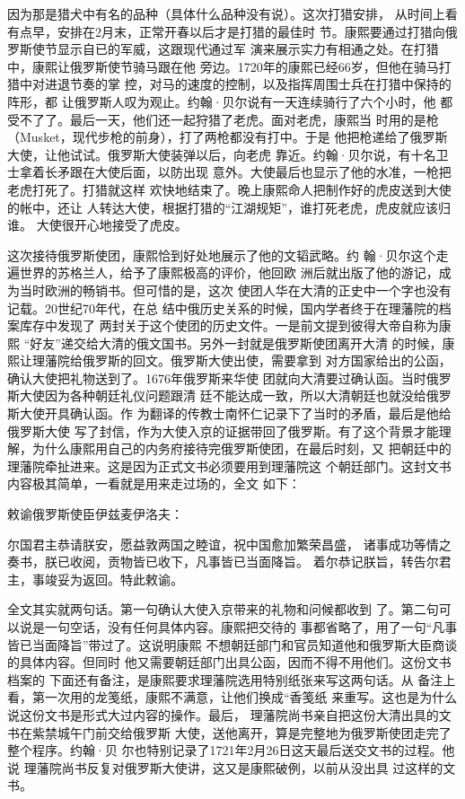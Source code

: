 因为那是猎犬中有名的品种（具体什么品种没有说）。这次打猎安排，%
从时间上看有点早，安排在2月末，正常开春以后才是打猎的最佳时%
节。康熙要通过打猎向俄罗斯使节显示自已的军威，这跟现代通过军%
演来展示实力有相通之处。在打猎中，康熙让俄罗斯使节骑马跟在他%
旁边。1720年的康熙已经66岁，但他在骑马打猎中对进退节奏的掌%
控，对马的速度的控制，以及指挥周围士兵在打猎中保持的阵形，都%
让俄罗斯人叹为观止。约翰·贝尔说有一天连续骑行了六个小时，他%
都受不了了。最后一天，他们还一起狩猎了老虎。面对老虎，康熙当%
时用的是枪（Musket，现代步枪的前身），打了两枪都没有打中。于是%
他把枪递给了俄罗斯大使，让他试试。俄罗斯大使装弹以后，向老虎%
靠近。约翰·贝尔说，有十名卫士拿着长矛跟在大使后面，以防出现%
意外。大使最后也显示了他的水准，一枪把老虎打死了。打猎就这样%
欢快地结束了。晚上康熙命人把制作好的虎皮送到大使的帐中，还让%
人转达大使，根据打猎的“江湖规矩”，谁打死老虎，虎皮就应该归谁。%
大使很开心地接受了虎皮。%
\par
这次接待俄罗斯使团，康熙恰到好处地展示了他的文韬武略。约%
翰·贝尔这个走遍世界的苏格兰人，给予了康熙极高的评价，他回欧%
洲后就出版了他的游记，成为当时欧洲的畅销书。但可惜的是，这次%
使团人华在大清的正史中一个字也没有记载。20世纪70年代，在总%
结中俄历史关系的时候，国内学者终于在理藩院的档案库存中发现了%
两封关于这个使团的历史文件。一是前文提到彼得大帝自称为康熙%
“好友”递交给大清的俄文国书。另外一封就是俄罗斯使团离开大清%
的时候，康熙让理藩院给俄罗斯的回文。俄罗斯大使出使，需要拿到%
对方国家给出的公函，确认大使把礼物送到了。1676年俄罗斯来华使%
团就向大清要过确认函。当时俄罗斯大使因为各种朝廷礼仪问题跟清%
廷不能达成一致，所以大清朝廷也就没给俄罗斯大使开具确认函。作%
为翻译的传教士南怀仁记录下了当时的矛盾，最后是他给俄罗斯大使%
写了封信，作为大使入京的证据带回了俄罗斯。有了这个背景才能理%
解，为什么康熙用自己的内务府接待完俄罗斯使团，在最后时刻，又%
把朝廷中的理藩院牵扯进来。这是因为正式文书必须要用到理藩院这%
个朝廷部门。这封文书内容极其简单，一看就是用来走过场的，全文%
如下：%
\par
{\bookkai 敕谕俄罗斯使臣伊兹麦伊洛夫：}%
\par
{\bookkai 尔国君主恭请朕安，愿益敦两国之睦谊，祝中国愈加繁荣昌盛，}%
{\bookkai 诸事成功等情之奏书，朕已收阅，贡物皆已收下，凡事皆已当面降旨。}%
{\bookkai 着尔恭记朕旨，转告尔君主，事竣妥为返回。特此敕谕。}%
\par
全文其实就两句话。第一句确认大使入京带来的礼物和问候都收到%
了。第二句可以说是一句空话，没有任何具体内容。康熙把交待的%
事都省略了，用了一句“凡事皆已当面降旨”带过了。这说明康熙%
不想朝廷部门和官员知道他和俄罗斯大臣商谈的具体内容。但同时%
他又需要朝廷部门出具公函，因而不得不用他们。这份文书档案的%
下面还有备注，是康熙要求理藩院选用特别纸张来写这两句话。从%
备注上看，第一次用的龙笺纸，康熙不满意，让他们换成“香笺纸%
来重写。这也是为什么说这份文书是形式大过内容的操作。最后，%
理藩院尚书亲自把这份大清出具的文书在紫禁城午门前交给俄罗斯%
大使，送他离开，算是完整地为俄罗斯使团走完了整个程序。约翰·贝%
尔也特别记录了1721年2月26日这天最后送交文书的过程。他说%
理藩院尚书反复对俄罗斯大使讲，这又是康熙破例，以前从没出具%
过这样的文书。%
